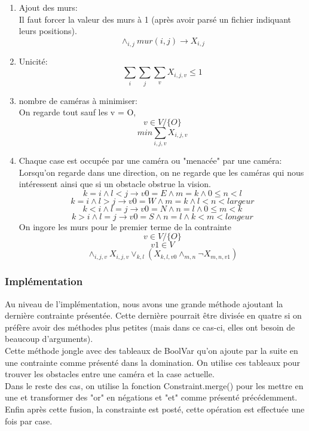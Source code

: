 \begin{enumerate}
    \item Ajout des murs:\\
    Il faut forcer la valeur des murs à 1 (après avoir parsé un fichier indiquant leurs positions).
    \[ \land_{i,j} mur (i,j) \longrightarrow  X_{i,j}\]
    
    \item Unicité:
    \[ \sum_{i} \sum_{j} \sum_{v} X_{i,j,v}  \leq 1 \]
    
    \item nombre de caméras à minimiser:\\
    On regarde tout sauf les v = O,
    \[  v \in V/\{O\}\]
    \[  min \sum_{i,j,v} X_{i,j,v} \]
    
    \item Chaque case est occupée par une caméra ou "menacée" par une caméra:\\
    Lorsqu'on regarde dans une direction, on ne regarde que les caméras qui nous intéressent
    ainsi que si un obstacle obstrue la vision. 
    \[ k = i \land l < j \longrightarrow v0 = E \land m=k \land 0 \leq n < l\]
    \[ k = i \land l > j \longrightarrow v0 = W \land m=k \land l < n < largeur  \]
    \[ k < i \land l = j \longrightarrow v0 = N \land n=l \land 0 \leq m < k\]
    \[ k > i \land l = j \longrightarrow v0 = S \land n=l \land k < m < longeur  \]
    On ingore les murs pour le premier terme de la contrainte
    \[ v \in V/\{O\}\]
    \[ v1 \in V \]
    \[  \land_{i,j,v} X_{i,j,v} \lor_{k,l} ( X_{k,l,v0} \land_{m,n} \neg X_{m,n,v1} )\]
\end{enumerate}


\subsubsection{Implémentation}
Au niveau de l'implémentation, nous avons une grande méthode ajoutant la dernière contrainte présentée. Cette dernière pourrait être divisée en quatre si on préfère avoir des méthodes plus petites (mais dans ce cas-ci, elles ont besoin de beaucoup d'arguments).\\
Cette méthode jongle avec des tableaux de BoolVar qu'on ajoute par la suite en une contrainte comme présenté dans la domination. On utilise ces tableaux pour trouver les obstacles entre une caméra et la case actuelle.\\
Dans le reste des cas, on utilise la fonction Constraint.merge() pour les mettre en une et transformer des "or" en négations et "et" comme présenté précédemment. Enfin après cette fusion, la constrainte est posté, cette opération est effectuée une fois par case.